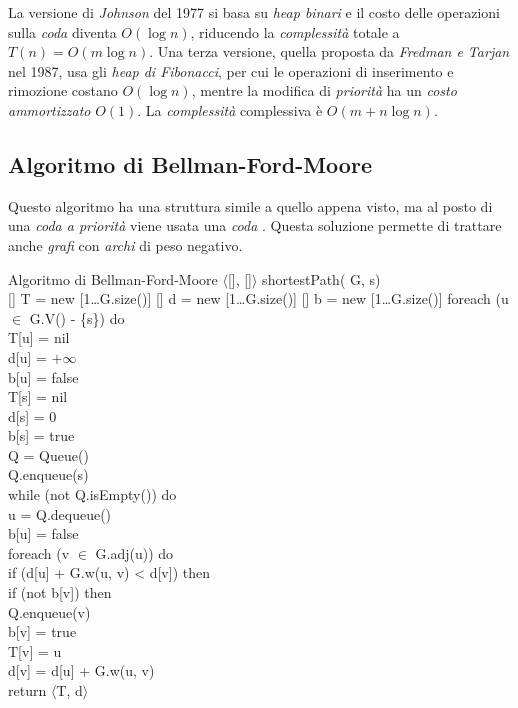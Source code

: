 La versione di \emph{Johnson} del 1977 si basa su \emph{heap binari} e il costo
delle operazioni sulla \emph{coda} diventa $O(\log n)$, riducendo la
\emph{complessità} totale a $T(n)=O(m\log n)$. Una terza versione, quella
proposta da \emph{Fredman e Tarjan} nel 1987, usa gli \emph{heap di Fibonacci},
per cui le operazioni di inserimento e rimozione costano $O(\log n)$, mentre la
modifica di \emph{priorità} ha un \emph{costo ammortizzato} $O(1)$. La
\emph{complessità} complessiva è $O(m+n\log n)$.

\subsection{Algoritmo di Bellman-Ford-Moore}
Questo algoritmo ha una struttura simile a quello appena visto, ma al posto di
una \emph{coda a priorità} viene usata una \emph{coda} . Questa
soluzione permette di trattare anche \emph{grafi} con \emph{archi} di peso
negativo.

\begin{minicode}{Algoritmo di Bellman-Ford-Moore}
\ind$\langle$[], []$\rangle$ shortestPath( G,  s)\\
[] T = new [1\dots G.size()]\hfill{}
[] d = new [1\dots G.size()]\hfill{}
[] b = new [1\dots G.size()]\hfill{}
\indf foreach (u $\in$ G.V() - \{s\}) do\\
    T[u] = nil\\
    d[u] = $+\infty$\\
    b[u] = false\\
\indf T[s] = nil\\
\indf d[s] = 0\\
\indf b[s] = true\\
\indf{} Q = Queue()\\
\indf Q.enqueue(s)\\
\indf while (not Q.isEmpty()) do\\
     u = Q.dequeue()\\
    b[u] = false\\
    \indff foreach (v $\in$ G.adj(u)) do\\
        \indfff if (d[u] + G.w(u, v) < d[v]) then\\
            \indffff if (not b[v]) then\\
                Q.enqueue(v)\\
                b[v] = true\\
        \indfff T[v] = u\\
        \indfff d[v] = d[u] + G.w(u, v)\\
\indf return $\langle$T, d$\rangle$
\end{minicode}

